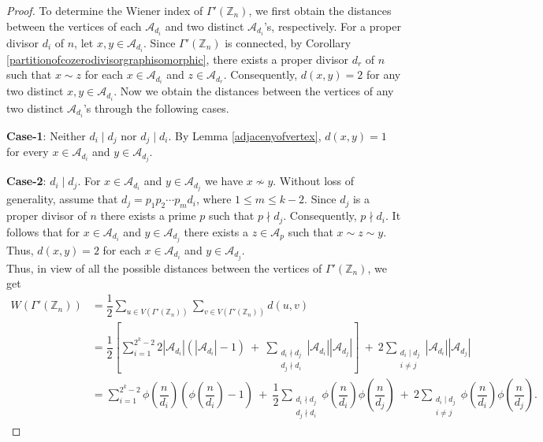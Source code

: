 \documentclass{amsart}
\theoremstyle{plain}
\theoremstyle{definition}
\theoremstyle{remark}
\begin{document}
\begin{proof}
To determine the Wiener index of $\Gamma'(\mathbb{Z}_n)$, we first obtain the distances between the vertices of each $\mathcal{A}_{d_i}$ and two distinct $\mathcal{A}_{d_i}$'s, respectively. For a proper divisor $d_i$ of $n$, let $x, y \in \mathcal{A}_{d_i}$. Since $\Gamma'(\mathbb{Z}_n)$ is connected, by Corollary \ref{partitionofcozerodivisorgraphisomorphic}, there exists a proper divisor $d_r$ of $n$ such that $x \sim z$ for each $x \in \mathcal{A}_{d_i}$ and $z \in \mathcal{A}_{d_r}$. Consequently, $d(x,y) = 2$ for any two distinct $x, y \in \mathcal{A}_{d_i}$. Now we obtain the distances between the vertices of any two distinct $\mathcal{A}_{d_i}$'s through the following cases.

\textbf{Case-1}: Neither $d_i\mid d_j$ nor $d_j \mid d_i$. By Lemma \ref{adjacenyofvertex}, $d(x,y) =1$ for every $x \in \mathcal{A}_{d_i}$ and $y \in \mathcal{A}_{d_j}$.

\textbf{Case-2}: $d_i\mid d_j$. For $x \in \mathcal{A}_{d_i}$ and $y \in \mathcal{A}_{d_j}$ we have $x \nsim y$. Without loss of generality, assume that $d_j = p_1p_2 \cdots p_md_i$, where $1 \leq m \leq k-2$. Since $d_j$ is a proper divisor of $n$ there exists a prime $p$ such that $p \nmid d_j$. Consequently, $p \nmid d_i$. It follows that for $x \in \mathcal{A}_{d_i}$ and $y \in \mathcal{A}_{d_j}$ there exists a $z \in \mathcal{A}_{p}$ such that $x \sim z \sim y$. Thus, $d(x,y)=2$ for each $x \in \mathcal{A}_{d_i}$ and $y \in \mathcal{A}_{d_j}$.\\

Thus, in view of all the possible distances between the vertices of $\Gamma'(\mathbb{Z}_n)$, we get
\begin{align*}
  W(\Gamma'(\mathbb{Z}_n)) &= \dfrac{1}{2}\sum_{u \in V(\Gamma'(\mathbb{Z}_n))}\sum_{v \in V(\Gamma'(\mathbb{Z}_n))} d(u,v)  \\
&=\dfrac{1}{2} \left[ \sum_{i=1}^{2^k-2} 2 |\mathcal{A}_{d_i}| \left(|\mathcal{A}_{d_i}| -1 \right) \ + \ \sum_{\substack{d_i \nmid d_j \\ d_j \nmid d_i}}|\mathcal{A}_{d_i}||\mathcal{A}_{d_j}| \right] \ + \ 2\sum_{\substack{d_i \mid d_j \\ i\neq j}}|\mathcal{A}_{d_i}||\mathcal{A}_{d_j}| \\
&= \sum_{i=1}^{2^k-2} \phi(\dfrac{n}{d_i})\left(\phi(\dfrac{n}{d_i})-1\right) \ + \  \dfrac{1}{2}\sum_{\substack{d_i \nmid d_j \\ d_j \nmid d_i}} \phi(\dfrac{n}{d_i})\phi(\dfrac{n}{d_j}) \ + \ 2\sum_{\substack{d_i \mid d_j \\ i\neq j}} \phi(\dfrac{n}{d_i})\phi(\dfrac{n}{d_j}).
\end{align*}
\end{proof}
\end{document}
